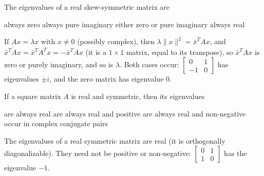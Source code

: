 \begin{question}[id=gate-ec2010-1, source=GATE EC 2010]
The eigenvalues of a real skew-symmetric matrix are
\begin{options}
  \option always zero
  \option always pure imaginary
  \correct either zero or pure imaginary
  \option always real
\end{options}
\begin{solution}
If $Ax = \lambda x$ with $x \ne 0$ (possibly complex), then $\lambda\|x\|^2 = \bar{x}^TAx$, and $\overline{\bar{x}^TAx} = \bar{x}^TA^Tx = -\bar{x}^TAx$ (it is a $1 \times 1$ matrix, equal to its transpose), so $\bar{x}^TAx$ is zero or purely imaginary, and so is $\lambda$. Both cases occur: $\begin{bmatrix} 0 & 1 \\ -1 & 0 \end{bmatrix}$ has eigenvalues $\pm i$, and the zero matrix has eigenvalue 0.
\end{solution}
\end{question}

\begin{question}[id=gate-me2007-1, source=GATE ME 2007]
If a square matrix $A$ is real and symmetric, then its eigenvalues
\begin{options}
  \correct are always real
  \option are always real and positive
  \option are always real and non-negative
  \option occur in complex conjugate pairs
\end{options}
\begin{solution}
The eigenvalues of a real symmetric matrix are real (it is orthogonally diagonalizable). They need not be positive or non-negative: $\begin{bmatrix} 0 & 1 \\ 1 & 0 \end{bmatrix}$ has the eigenvalue $-1$.
\end{solution}
\end{question}


